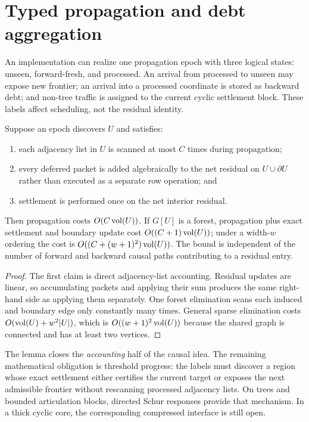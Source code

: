 \section{Typed propagation and debt aggregation}
\label{sec:typed-propagation}

An implementation can realize one propagation epoch with three logical
states: unseen, forward-fresh, and processed.  An arrival from processed to
unseen may expose new frontier; an arrival into a processed coordinate is
stored as backward debt; and non-tree traffic is assigned to the current
cyclic settlement block.  These labels affect scheduling, not the residual
identity.

\begin{lemma}
\label{lem:one-scan-causal-epoch}
Suppose an epoch discovers $U$ and satisfies:
\begin{enumerate}[label=(\roman*),leftmargin=*]
 \item each adjacency list in $U$ is scanned at most $C$ times during
 propagation;
 \item every deferred packet is added algebraically to the net residual on
 $U\cup\partial U$ rather than executed as a separate row operation; and
 \item settlement is performed once on the net interior residual.
\end{enumerate}
Then propagation costs $O(C\operatorname{vol}(U))$.  If $G[U]$ is a forest, propagation
plus exact settlement and boundary update cost $O((C+1)\operatorname{vol}(U))$; under a
width-$w$ ordering the cost is
$O((C+(w+1)^2)\operatorname{vol}(U))$.  The bound is independent of the number of forward
and backward causal paths contributing to a residual entry.
\end{lemma}

\begin{proof}
The first claim is direct adjacency-list accounting.  Residual updates are
linear, so accumulating packets and applying their sum produces the same
right-hand side as applying them separately.  One forest elimination scans
each induced and boundary edge only constantly many times.  General sparse
elimination costs $O(\operatorname{vol}(U)+w^2|U|)$, which is
$O((w+1)^2\operatorname{vol}(U))$ because the shared graph is connected and has at least
two vertices.
\end{proof}

The lemma closes the \emph{accounting} half of the causal idea.  The remaining
mathematical obligation is threshold progress: the labels must discover a
region whose exact settlement either certifies the current target or exposes
the next admissible frontier without rescanning processed adjacency lists.
On trees and bounded articulation blocks, directed Schur responses provide
that mechanism.  In a thick cyclic core, the corresponding compressed
interface is still open.
